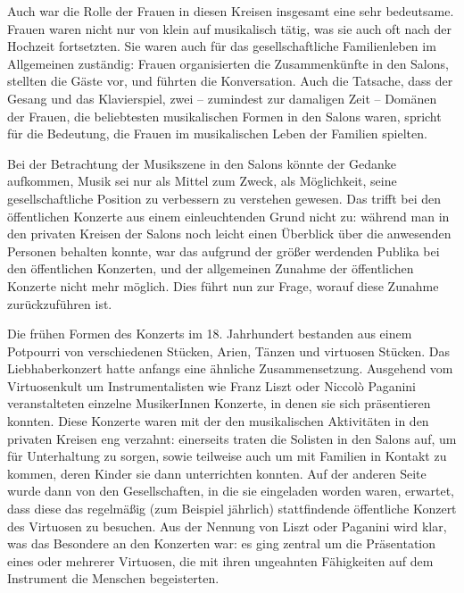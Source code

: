 \documentclass[a4paper, german, oneside]{scrbook}
\begin{document}
Auch war die Rolle der Frauen in diesen Kreisen insgesamt eine sehr bedeutsame. Frauen waren nicht nur von klein auf musikalisch tätig, was sie auch oft nach der Hochzeit fortsetzten. Sie waren auch für das gesellschaftliche Familienleben im Allgemeinen zuständig: Frauen organisierten die Zusammenkünfte in den Salons, stellten die Gäste vor, und führten die Konversation. Auch die Tatsache, dass der Gesang und das Klavierspiel, zwei -- zumindest zur damaligen Zeit -- Domänen der Frauen, die beliebtesten musikalischen Formen in den Salons waren, spricht für die Bedeutung, die Frauen im musikalischen Leben der Familien spielten. \parencite[vgl.][41]{weber_music_2004}

Bei der Betrachtung der Musikszene in den Salons könnte der Gedanke aufkommen, Musik sei nur als Mittel zum Zweck, als Möglichkeit, seine gesellschaftliche Position zu verbessern zu verstehen gewesen. Das trifft bei den öffentlichen Konzerte aus einem einleuchtenden Grund nicht zu: während man in den privaten Kreisen der Salons noch leicht einen Überblick über die anwesenden Personen behalten konnte, war das aufgrund der größer werdenden Publika bei den öffentlichen Konzerten, und der allgemeinen Zunahme der öffentlichen Konzerte nicht mehr möglich. \parencite[vgl.][37]{weber_music_2004} Dies führt nun zur Frage, worauf diese Zunahme zurückzuführen ist. 

Die frühen Formen des Konzerts im 18. Jahrhundert bestanden aus einem Potpourri von verschiedenen Stücken, Arien, Tänzen und virtuosen Stücken. Das Liebhaberkonzert hatte anfangs eine ähnliche Zusammensetzung. Ausgehend vom Virtuosenkult um Instrumentalisten wie Franz Liszt oder Niccolò Paganini veranstalteten einzelne MusikerInnen Konzerte, in denen sie sich präsentieren konnten. Diese Konzerte waren mit der den musikalischen Aktivitäten in den privaten Kreisen eng verzahnt: einerseits traten die Solisten in den Salons auf, um für Unterhaltung zu sorgen, sowie teilweise auch um mit Familien in Kontakt zu kommen, deren Kinder sie dann unterrichten konnten. Auf der anderen Seite wurde dann von den Gesellschaften, in die sie eingeladen worden waren, erwartet, dass diese das regelmäßig (zum Beispiel jährlich) stattfindende öffentliche Konzert des Virtuosen zu besuchen. Aus der Nennung von Liszt oder Paganini wird klar, was das Besondere an den Konzerten war: es ging zentral um die Präsentation eines oder mehrerer Virtuosen, die mit ihren ungeahnten Fähigkeiten auf dem Instrument die Menschen begeisterten. \parencite[vgl.][24]{weber_music_2004}
\end{document}
